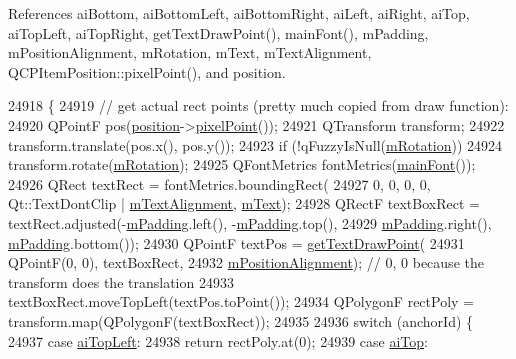 References ai\+Bottom, ai\+Bottom\+Left, ai\+Bottom\+Right, ai\+Left, ai\+Right, ai\+Top, ai\+Top\+Left, ai\+Top\+Right, get\+Text\+Draw\+Point(), main\+Font(), m\+Padding, m\+Position\+Alignment, m\+Rotation, m\+Text, m\+Text\+Alignment, Q\+C\+P\+Item\+Position\+::pixel\+Point(), and position.


\begin{DoxyCode}
24918                                                         \{
24919   \textcolor{comment}{// get actual rect points (pretty much copied from draw function):}
24920   QPointF pos(\hyperlink{class_q_c_p_item_text_a0d228a00e819022b5690c65762721129}{position}->\hyperlink{class_q_c_p_item_position_ae490f9c76ee2ba33752c495d3b6e8fb5}{pixelPoint}());
24921   QTransform transform;
24922   transform.translate(pos.x(), pos.y());
24923   \textcolor{keywordflow}{if} (!qFuzzyIsNull(\hyperlink{class_q_c_p_item_text_ac37df0061552225d2277e1ee3b48f2cb}{mRotation}))
24924     transform.rotate(\hyperlink{class_q_c_p_item_text_ac37df0061552225d2277e1ee3b48f2cb}{mRotation});
24925   QFontMetrics fontMetrics(\hyperlink{class_q_c_p_item_text_a23d391bd6471c45e73f45add67ede902}{mainFont}());
24926   QRect textRect = fontMetrics.boundingRect(
24927       0, 0, 0, 0, Qt::TextDontClip | \hyperlink{class_q_c_p_item_text_acdb2e50c38e83da00f083771efbd213f}{mTextAlignment}, \hyperlink{class_q_c_p_item_text_a2dec3e08c11f51639629374ecec3bd62}{mText});
24928   QRectF textBoxRect = textRect.adjusted(-\hyperlink{class_q_c_p_item_text_ae7b3ef0ce6046efd4b346d28f2e1fb67}{mPadding}.left(), -\hyperlink{class_q_c_p_item_text_ae7b3ef0ce6046efd4b346d28f2e1fb67}{mPadding}.top(),
24929                                          \hyperlink{class_q_c_p_item_text_ae7b3ef0ce6046efd4b346d28f2e1fb67}{mPadding}.right(), \hyperlink{class_q_c_p_item_text_ae7b3ef0ce6046efd4b346d28f2e1fb67}{mPadding}.bottom());
24930   QPointF textPos = \hyperlink{class_q_c_p_item_text_aa6e478b1ce198eace89157c4cacc3ddc}{getTextDrawPoint}(
24931       QPointF(0, 0), textBoxRect,
24932       \hyperlink{class_q_c_p_item_text_a6c27f7dc1a962a04b32430cf99f04654}{mPositionAlignment}); \textcolor{comment}{// 0, 0 because the transform does the translation}
24933   textBoxRect.moveTopLeft(textPos.toPoint());
24934   QPolygonF rectPoly = transform.map(QPolygonF(textBoxRect));
24935 
24936   \textcolor{keywordflow}{switch} (anchorId) \{
24937   \textcolor{keywordflow}{case} \hyperlink{class_q_c_p_item_text_a14a84e58f72519c8ae1d7a4a1dd23f21a30342ee15065715f045cb52eb77b904c}{aiTopLeft}:
24938     \textcolor{keywordflow}{return} rectPoly.at(0);
24939   \textcolor{keywordflow}{case} \hyperlink{class_q_c_p_item_text_a14a84e58f72519c8ae1d7a4a1dd23f21a55ce9699c71db6d264eb669bb0eb9aff}{aiTop}:

\end{DoxyCode}
